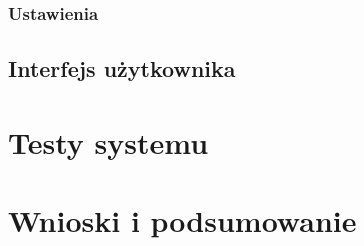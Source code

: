 \documentclass[a4paper,12pt,twoside]{article}
\begin{document}
\subsubsection{Ustawienia}

\subsection{Interfejs użytkownika}
\newpage

\section{Testy systemu}

\newpage
\section{Wnioski i podsumowanie}

\newpage
\end{document}
